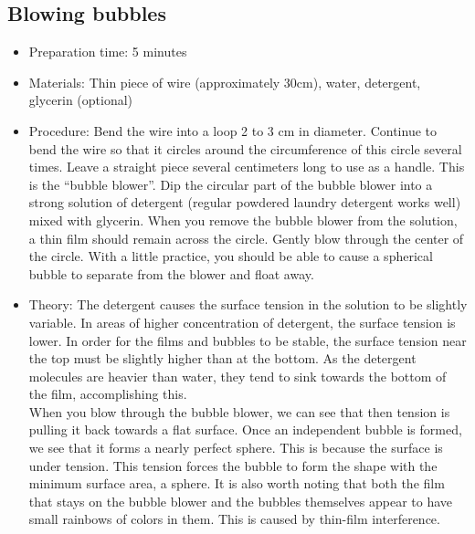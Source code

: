 \subsection{Blowing bubbles}
\begin{itemize}
\item{Preparation time: 5 minutes}
\item{Materials: Thin piece of wire (approximately 30cm), water, detergent, glycerin (optional)}
\item{Procedure: Bend the wire into a loop 2 to 3 cm in diameter. Continue to bend the wire so that it circles around the circumference of this circle several times. Leave a straight piece several centimeters long to use as a handle. This is the “bubble blower”. Dip the circular part of the bubble blower into a strong solution of detergent (regular powdered laundry detergent works well) mixed with glycerin. When you remove the bubble blower from the solution, a thin film should remain across the circle. Gently blow through the center of the circle. With a little practice, you should be able to cause a spherical bubble to separate from the blower and float away.}
\item{Theory: The detergent causes the surface tension in the solution to be slightly variable. In areas of higher concentration of detergent, the surface tension is lower. In order for the films and bubbles to be stable, the surface tension near the top must be slightly higher than at the bottom. As the detergent molecules are heavier than water, they tend to sink towards the bottom of the film, accomplishing this.\\
When you blow through the bubble blower, we can see that then tension is pulling it back towards a flat surface. Once an independent bubble is formed, we see that it forms a nearly perfect sphere. This is because the surface is under tension. This tension forces the bubble to form the shape with the minimum surface area, a sphere. It is also worth noting that both the film that stays on the bubble blower and the bubbles themselves appear to have small rainbows of colors in them. This is caused by thin-film interference.}
\end{itemize}


